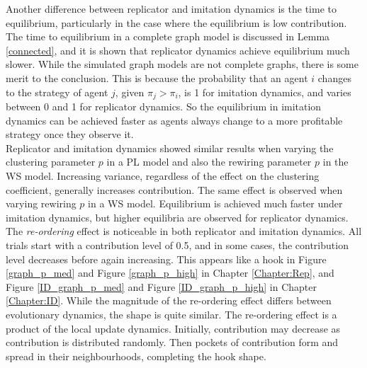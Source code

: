 Another difference between replicator and imitation dynamics is the time to equilibrium, particularly in the case where the equilibrium is low contribution. The time to equilibrium in a complete graph model is discussed in Lemma \ref{connected}, and it is shown that replicator dynamics achieve equilibrium much slower. While the simulated graph models are not complete graphs, there is some merit to the conclusion. This is because the probability that an agent $i$ changes to the strategy of agent $j$, given $\pi_j>\pi_i$, is 1 for imitation dynamics, and varies between 0 and 1 for replicator dynamics. So the equilibrium in imitation dynamics can be achieved faster as agents always change to a more profitable strategy once they observe it. \\



Replicator and imitation dynamics showed similar results when varying the clustering parameter $p$ in a PL model and also the rewiring parameter $p$ in the WS model. Increasing variance, regardless of the effect on the clustering coefficient, generally increases contribution. The same effect is observed when varying rewiring $p$ in a WS model. Equilibrium is achieved much faster under imitation dynamics, but higher equilibria are observed for replicator dynamics.  \\

The \emph{re-ordering} effect is noticeable in both replicator and imitation dynamics. All trials start with a contribution level of 0.5, and in some cases, the contribution level decreases before again increasing. This appears like a hook in Figure \ref{graph_p_med} and Figure \ref{graph_p_high} in Chapter \ref{Chapter:Rep}, and Figure \ref{ID_graph_p_med} and Figure \ref{ID_graph_p_high} in Chapter \ref{Chapter:ID}. While the magnitude of the re-ordering effect differs between evolutionary dynamics, the shape is quite similar. The re-ordering effect is a product of the local update dynamics. Initially, contribution may decrease as contribution is distributed randomly. Then pockets of contribution form and spread in their neighbourhoods, completing the hook shape.











